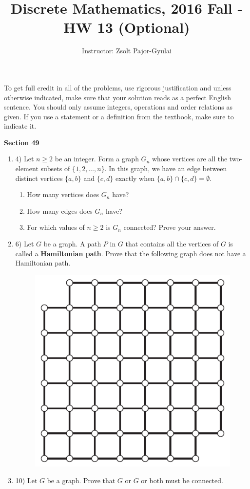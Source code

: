 \documentclass[11pt]{preprint}
\title{Discrete Mathematics, 2016 Fall - HW 13 (Optional)}
\author{Instructor: Zsolt Pajor-Gyulai}
\institute{Courant Institute of Mathematical Sciences, NYU}
\def\enumb{\begin{enumerate}}
\def\enume{\end{enumerate}}
\begin{document}
\maketitle

To get full credit  in all of the problems, use rigorous justification and unless otherwise indicated, make sure that your solution reads as a perfect English sentence. You should only assume integers, operations and order relations as given. If you use a statement or a definition from the textbook, make sure to indicate it.
\vspace{0.2cm}


\textbf{Section 49}
\enumb
\item[4)] Let $n\geq 2$ be an integer. Form a graph $G_n$ whose vertices are all the two-element subsets of $\{1,2,\dots,n\}$. In this graph, we have an edge between distinct vertices $\{a,b\}$ and $\{c,d\}$ exactly when $\{a,b\}\cap\{c,d\}=\emptyset$.
\enumb
\item How many vertices does $G_n$ have?
\item How many edges does $G_n$ have?
\item For which values of $n\geq 2$ is $G_n$ connected? Prove your answer.
\enume
\item[6)] Let $G$ be a graph. A path $P$ in $G$ that contains all the vertices of $G$ is called a \textbf{Hamiltonian path}. Prove that the following graph does not have a Hamiltonian path. 

\begin{figure}[ht]
\centering
\includegraphics[scale=0.3]{HW1.pdf}
\end{figure}
\item[10)] Let $G$ be a graph. Prove that $G$ or $\bar{G}$ or both must be connected.
\enume
\end{document}
